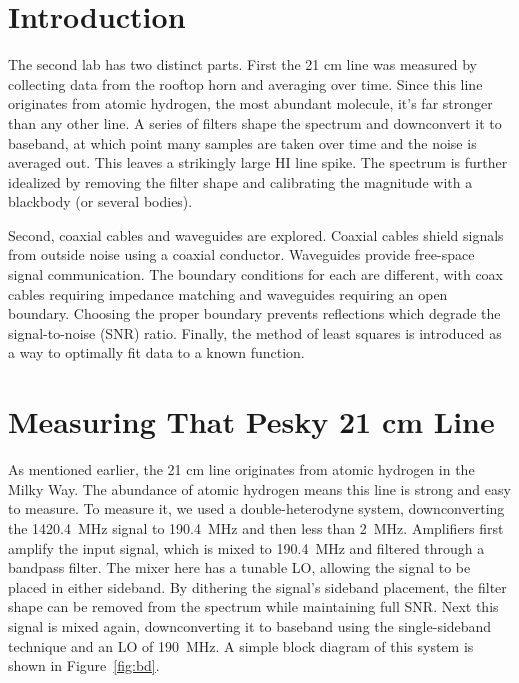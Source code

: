 \documentclass[12pt]{article}
\begin{document}
\maketitle

\section{Introduction}
The second lab has two distinct parts.
First the 21 cm line was measured by collecting data from the rooftop horn and averaging over time.
Since this line originates from atomic hydrogen, the most abundant molecule, it's far stronger than any other line.
A series of filters shape the spectrum and downconvert it to baseband, at which point many samples are taken over time and the noise is averaged out.
This leaves a strikingly large HI line spike.
The spectrum is further idealized by removing the filter shape and calibrating the magnitude with a blackbody (or several bodies).

Second, coaxial cables and waveguides are explored.
Coaxial cables shield signals from outside noise using a coaxial conductor.
Waveguides provide free-space signal communication.
The boundary conditions for each are different, with coax cables requiring impedance matching and waveguides requiring an open boundary.
Choosing the proper boundary prevents reflections which degrade the signal-to-noise (SNR) ratio.
Finally, the method of least squares is introduced as a way to optimally fit data to a known function.


\section{Measuring That Pesky 21 cm Line}
As mentioned earlier, the 21 cm line originates from atomic hydrogen in the Milky Way.
The abundance of atomic hydrogen means this line is strong and easy to measure.
To measure it, we used a double-heterodyne system, downconverting the 1420.4~MHz signal to 190.4~MHz and then less than 2~MHz.
Amplifiers first amplify the input signal, which is mixed to 190.4~MHz and filtered through a bandpass filter.
The mixer here has a tunable LO, allowing the signal to be placed in either sideband.
By dithering the signal's sideband placement, the filter shape can be removed from the spectrum while maintaining full SNR.
Next this signal is mixed again, downconverting it to baseband using the single-sideband technique and an LO of 190~MHz.
A simple block diagram of this system is shown in Figure~\ref{fig:bd}.
\end{document}
